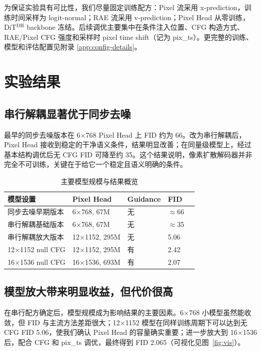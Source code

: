 \documentclass[11pt]{article}
\begin{document}
为保证实验具有可比性，我们尽量固定训练配方：Pixel 流采用 x-prediction，训练时间采样为 logit-normal；RAE 流采用 v-prediction；Pixel Head 从零训练，DiT$^{\mathrm{DH}}$ backbone 冻结。后续调优主要集中在条件注入位置、CFG 构造方式、RAE/Pixel CFG 强度和采样时 pixel time shift（记为 pix\_ts）。更完整的训练、模型和评估配置见附录 \ref{app:config-details}。

\section{实验结果}

\subsection{串行解耦显著优于同步去噪}

最早的同步去噪版本在 6$\times$768 Pixel Head 上 FID 约为 66。改为串行解耦后，Pixel Head 接收到稳定的干净语义条件，结果明显改善；在同量级模型上，经过基本结构调优后无 CFG FID 可降至约 35。这个结果说明，像素扩散解码器并非完全不可训练，关键在于给它一个稳定且语义明确的条件。

\begin{table}[H]
\centering
\caption{主要模型规模与结果概览}
\begin{tabular}{lllll}
\toprule
模型设置 & Pixel Head & Guidance & FID \\
\midrule
同步去噪早期版本 & 6$\times$768, 67M & 无 & $\approx$66 \\
串行解耦基础版本 & 6$\times$768, 67M & 无 & $\approx$35 \\
串行解耦放大版本 & 12$\times$1152, 295M & 无 & 5.06 \\
12$\times$1152 null CFG & 12$\times$1152, 295M & 有 & 2.42 \\
16$\times$1536 null CFG & 16$\times$1536, 693M & 有 & 2.07 \\
\bottomrule
\end{tabular}
\end{table}

\subsection{模型放大带来明显收益，但代价很高}

在串行配方确定后，模型规模成为影响结果的主要因素。6$\times$768 小模型虽然能收敛，但 FID 与主流方法差距很大；12$\times$1152 模型在同样训练周期下可以达到无 CFG FID 5.06，使我们确认 Pixel Head 的容量确实重要；进一步放大到 16$\times$1536 后，配合 CFG 和 pix\_ts 调优，最终得到 FID 2.065（可视化见图~\ref{fig:vis}）。
\end{document}
